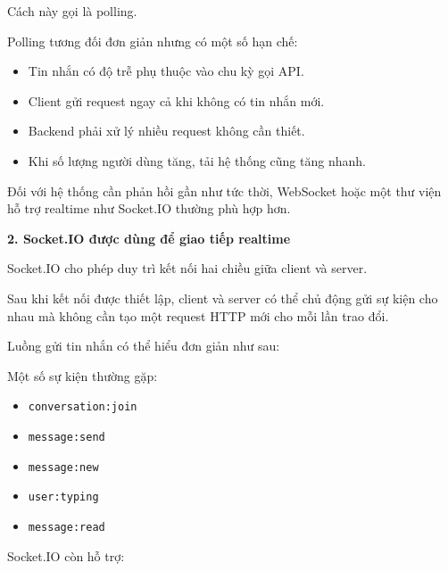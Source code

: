 Cách này gọi là polling.

Polling tương đối đơn giản nhưng có một số hạn chế:

\begin{itemize}
\tightlist
\item
  Tin nhắn có độ trễ phụ thuộc vào chu kỳ gọi API.
\item
  Client gửi request ngay cả khi không có tin nhắn mới.
\item
  Backend phải xử lý nhiều request không cần thiết.
\item
  Khi số lượng người dùng tăng, tải hệ thống cũng tăng nhanh.
\end{itemize}

Đối với hệ thống cần phản hồi gần như tức thời, WebSocket hoặc một thư
viện hỗ trợ realtime như Socket.IO thường phù hợp hơn.

\vspace{0.5em}\noindent\textbf{2. Socket.IO được dùng để giao tiếp
realtime}\par

Socket.IO cho phép duy trì kết nối hai chiều giữa client và server.

Sau khi kết nối được thiết lập, client và server có thể chủ động gửi sự
kiện cho nhau mà không cần tạo một request HTTP mới cho mỗi lần trao
đổi.

Luồng gửi tin nhắn có thể hiểu đơn giản như sau:

\begin{Shaded}
\begin{Highlighting}[]
\end{Highlighting}
\end{Shaded}

Một số sự kiện thường gặp:

\begin{itemize}
\tightlist
\item
  \texttt{conversation:join}
\item
  \texttt{message:send}
\item
  \texttt{message:new}
\item
  \texttt{user:typing}
\item
  \texttt{message:read}
\end{itemize}

Socket.IO còn hỗ trợ:

